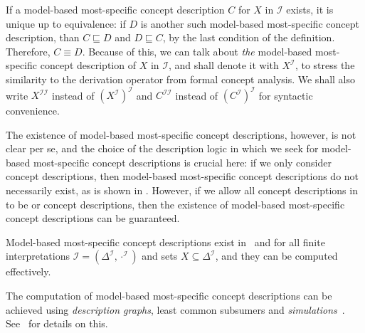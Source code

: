 If a model-based most-specific concept description $C$ for $X$ in $\mathcal{I}$ exists, it
is unique up to equivalence: if $D$ is another such model-based most-specific concept
description, than $C \sqsubseteq D$ and $D \sqsubseteq C$, by the last condition of the
definition.  Therefore, $C \equiv D$.  Because of this, we can talk about \emph{the}
model-based most-specific concept description of $X$ in $\mathcal{I}$, and shall denote it
with $X^{\mathcal{I}}$, to stress the similarity to the derivation operator from formal
concept analysis.  We shall also write $X^{\mathcal{I}\mathcal{I}}$ instead of
$(X^{\mathcal{I}})^{\mathcal{I}}$ and $C^{\mathcal{I}\mathcal{I}}$ instead of
$(C^{\mathcal{I}})^{\mathcal{I}}$ for syntactic convenience.

The existence of model-based most-specific concept descriptions, however, is not clear per
se, and the choice of the description logic in which we seek for model-based most-specific
concept descriptions is crucial here: if we only consider \ELbot concept descriptions,
then model-based most-specific concept descriptions do not necessarily exist, as is shown
in .  However, if we allow all concept
descriptions in  to be \ELgfp or \ELgfpbot
concept descriptions, then the existence of model-based most-specific concept descriptions
can be guaranteed.

\begin{Theorem}
  \label{thm:existence-of-mmscs-in-ELgfpbot}
  Model-based most-specific concept descriptions exist in \ELgfp\ and \ELgfpbot for all
  finite interpretations $\mathcal{I} = (\Delta^{\mathcal{I}}, \cdot^{\mathcal{I}})$ and
  sets $X \subseteq \Delta^{\mathcal{I}}$, and they can be computed effectively.
\end{Theorem}

The computation of model-based most-specific concept descriptions can be achieved using
\emph{\EL description graphs}, least common subsumers and
\emph{simulations}~\cite{DBLP:conf/ijcai/Baader03a,Diss-Felix}.  See~\cite[Section
4.1.2]{Diss-Felix} for details on this.


